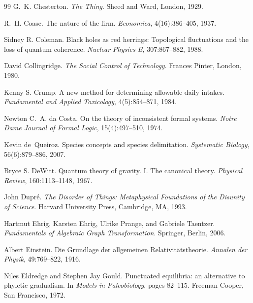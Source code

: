 \documentclass[11pt,a4paper]{article}
\theoremstyle{remark}\newtheorem{remark}[definition]{Remark}
\begin{document}
\begin{thebibliography}{99}
G.~K. Chesterton.
\newblock \emph{The Thing}.
\newblock Sheed and Ward, London, 1929.

R.~H. Coase.
\newblock The nature of the firm.
\newblock \emph{Economica}, 4(16):386--405, 1937.

Sidney R. Coleman.
\newblock Black holes as red herrings: Topological fluctuations and the loss of quantum coherence.
\newblock \emph{Nuclear Physics B}, 307:867--882, 1988.

David Collingridge.
\newblock \emph{The Social Control of Technology}.
\newblock Frances Pinter, London, 1980.

Kenny S. Crump.
\newblock A new method for determining allowable daily intakes.
\newblock \emph{Fundamental and Applied Toxicology}, 4(5):854--871, 1984.

Newton C.~A. da Costa.
\newblock On the theory of inconsistent formal systems.
\newblock \emph{Notre Dame Journal of Formal Logic}, 15(4):497--510, 1974.

Kevin de~Queiroz.
\newblock Species concepts and species delimitation.
\newblock \emph{Systematic Biology}, 56(6):879--886, 2007.

Bryce S. DeWitt.
\newblock Quantum theory of gravity. I. The canonical theory.
\newblock \emph{Physical Review}, 160:1113--1148, 1967.

John Dupr\'e.
\newblock \emph{The Disorder of Things: Metaphysical Foundations of the Disunity of Science}.
\newblock Harvard University Press, Cambridge, MA, 1993.

Hartmut Ehrig, Karsten Ehrig, Ulrike Prange, and Gabriele Taentzer.
\newblock \emph{Fundamentals of Algebraic Graph Transformation}.
\newblock Springer, Berlin, 2006.

Albert Einstein.
\newblock Die Grundlage der allgemeinen Relativit\"atstheorie.
\newblock \emph{Annalen der Physik}, 49:769--822, 1916.

Niles Eldredge and Stephen Jay Gould.
\newblock Punctuated equilibria: an alternative to phyletic gradualism.
\newblock In \emph{Models in Paleobiology}, pages 82--115. Freeman Cooper, San Francisco, 1972.


\end{thebibliography}
\end{document}
